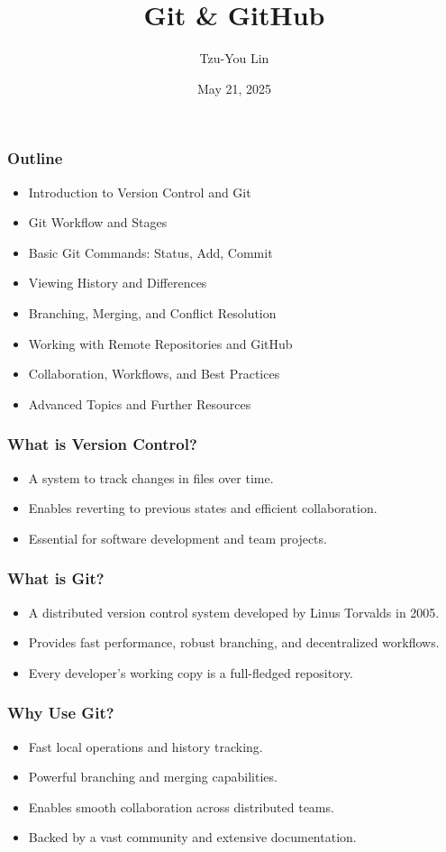 \documentclass[10pt]{beamer}
\title{Git \& GitHub}
\author{Tzu-You Lin}
\date{May 21, 2025}
\begin{document}
\begin{frame}
    \titlepage
\end{frame}

\begin{frame}
    \frametitle{Outline}
    \begin{itemize}
        \item Introduction to Version Control and Git
        \item Git Workflow and Stages
        \item Basic Git Commands: Status, Add, Commit
        \item Viewing History and Differences
        \item Branching, Merging, and Conflict Resolution
        \item Working with Remote Repositories and GitHub
        \item Collaboration, Workflows, and Best Practices
        \item Advanced Topics and Further Resources
    \end{itemize}
\end{frame}

\begin{frame}
    \frametitle{What is Version Control?}
    \begin{itemize}
        \item A system to track changes in files over time.
        \item Enables reverting to previous states and efficient collaboration.
        \item Essential for software development and team projects.
    \end{itemize}
\end{frame}

\begin{frame}
    \frametitle{What is Git?}
    \begin{itemize}
        \item A distributed version control system developed by Linus Torvalds in 2005.
        \item Provides fast performance, robust branching, and decentralized workflows.
        \item Every developer's working copy is a full-fledged repository.
    \end{itemize}
\end{frame}

\begin{frame}
    \frametitle{Why Use Git?}
    \begin{itemize}
        \item Fast local operations and history tracking.
        \item Powerful branching and merging capabilities.
        \item Enables smooth collaboration across distributed teams.
        \item Backed by a vast community and extensive documentation.
    \end{itemize}
\end{frame}
\end{document}
